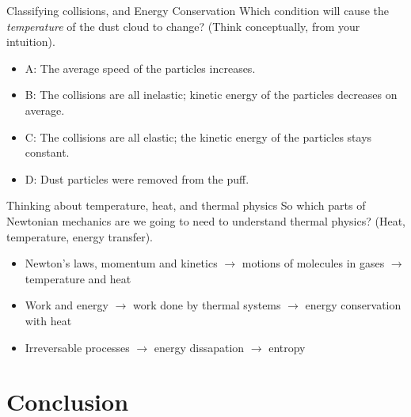 \documentclass{beamer}
\begin{document}
\begin{frame}{Classifying collisions, and Energy Conservation}
Which condition will cause the \textit{temperature} of the dust cloud to change?  (Think conceptually, from your intuition).
\begin{itemize}
\item A: The average speed of the particles increases.
\item B: The collisions are all inelastic; kinetic energy of the particles decreases on average.
\item C: The collisions are all elastic; the kinetic energy of the particles stays constant.
\item D: Dust particles were removed from the puff.
\end{itemize}
\end{frame}

\begin{frame}{Thinking about temperature, heat, and thermal physics}
So which parts of Newtonian mechanics are we going to need to understand thermal physics? (Heat, temperature, energy transfer).
\begin{itemize}
\item Newton's laws, momentum and kinetics $\rightarrow$ motions of molecules in gases $\rightarrow$ temperature and heat
\item Work and energy $\rightarrow$ work done by thermal systems $\rightarrow$ energy conservation with heat
\item Irreversable processes $\rightarrow$ energy dissapation $\rightarrow$ entropy
\end{itemize}
\end{frame}

\section{Conclusion}
\end{document}
